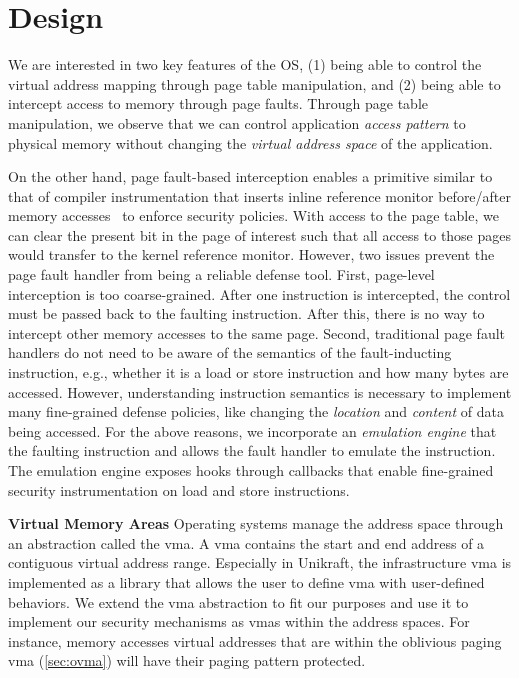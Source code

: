 \section{Design}
\label{wtg}
We are interested in two key features of the OS, (1) being able to control the virtual address mapping through page table manipulation, and (2) being able to intercept access to memory through page faults.
Through page table manipulation, we observe that we can control application \emph{access pattern} to physical memory without changing the \emph{virtual address space} of the application.

On the other hand, page fault-based interception enables a primitive similar to that of compiler instrumentation that inserts inline reference monitor before/after memory accesses~\cite{asan,wichelmann_cipherfix_nodate,dynpta} to enforce security policies. 
With access to the page table, we can clear the present bit in the page of interest such that all access to those pages would transfer to the kernel reference monitor.
However, two issues prevent the page fault handler from being a reliable defense tool.
First, page-level interception is too coarse-grained. After one instruction is intercepted, the control must be passed back to the faulting instruction. After this, there is no way to intercept other memory accesses to the same page. 
Second, traditional page fault handlers do not need to be aware of the semantics of the fault-inducting instruction, e.g., whether it is a load or store instruction and how many bytes are accessed. 
However, understanding instruction semantics is necessary to implement many fine-grained defense policies, like changing the \emph{location} and \emph{content} of data being accessed.
For the above reasons, we incorporate an \emph{emulation engine} that the faulting instruction and allows the fault handler to emulate the instruction. The emulation engine exposes hooks through callbacks that enable fine-grained security instrumentation on load and store instructions.

\textbf{Virtual Memory Areas}
Operating systems manage the address space through an abstraction called the \gls{vma}. A \gls{vma} contains the start and end address of a contiguous virtual address range. 
Especially in Unikraft, the infrastructure \gls{vma} is implemented as a library that allows the user to define \gls{vma} with user-defined behaviors.
We extend the \gls{vma} abstraction to fit our purposes and use it to implement our security mechanisms as \glspl{vma} within the address spaces. For instance, memory accesses virtual addresses that are within the oblivious paging \gls{vma} (\autoref{sec:ovma}) will have their paging pattern protected.






